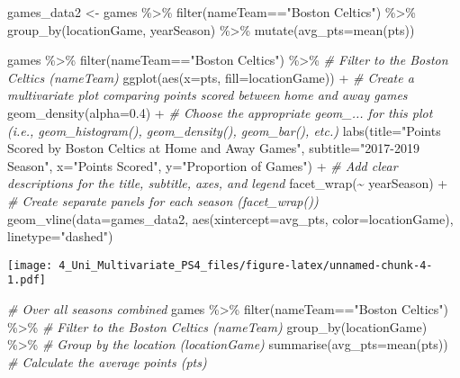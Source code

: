 \documentclass[
]{article}
\newenvironment{Shaded}{\begin{snugshade}}{\end{snugshade}}
\newcommand{\AttributeTok}[1]{\textcolor[rgb]{0.77,0.63,0.00}{#1}}
\newcommand{\CommentTok}[1]{\textcolor[rgb]{0.56,0.35,0.01}{\textit{#1}}}
\newcommand{\FloatTok}[1]{\textcolor[rgb]{0.00,0.00,0.81}{#1}}
\newcommand{\FunctionTok}[1]{\textcolor[rgb]{0.00,0.00,0.00}{#1}}
\newcommand{\NormalTok}[1]{#1}
\newcommand{\OtherTok}[1]{\textcolor[rgb]{0.56,0.35,0.01}{#1}}
\newcommand{\SpecialCharTok}[1]{\textcolor[rgb]{0.00,0.00,0.00}{#1}}
\newcommand{\StringTok}[1]{\textcolor[rgb]{0.31,0.60,0.02}{#1}}
\begin{document}
\begin{Shaded}
\begin{Highlighting}[]
\NormalTok{games\_data2 }\OtherTok{\textless{}{-}}\NormalTok{ games }\SpecialCharTok{\%\textgreater{}\%}
  \FunctionTok{filter}\NormalTok{(nameTeam}\SpecialCharTok{==}\StringTok{"Boston Celtics"}\NormalTok{) }\SpecialCharTok{\%\textgreater{}\%}
  \FunctionTok{group\_by}\NormalTok{(locationGame, yearSeason) }\SpecialCharTok{\%\textgreater{}\%}
  \FunctionTok{mutate}\NormalTok{(}\AttributeTok{avg\_pts=}\FunctionTok{mean}\NormalTok{(pts))}
  
\NormalTok{games }\SpecialCharTok{\%\textgreater{}\%}
  \FunctionTok{filter}\NormalTok{(nameTeam}\SpecialCharTok{==}\StringTok{"Boston Celtics"}\NormalTok{) }\SpecialCharTok{\%\textgreater{}\%} \CommentTok{\# Filter to the Boston Celtics (nameTeam)}
  \FunctionTok{ggplot}\NormalTok{(}\FunctionTok{aes}\NormalTok{(}\AttributeTok{x=}\NormalTok{pts, }\AttributeTok{fill=}\NormalTok{locationGame)) }\SpecialCharTok{+} \CommentTok{\# Create a multivariate plot comparing points scored between home and away games}
  \FunctionTok{geom\_density}\NormalTok{(}\AttributeTok{alpha=}\FloatTok{0.4}\NormalTok{) }\SpecialCharTok{+} \CommentTok{\# Choose the appropriate geom\_... for this plot (i.e., geom\_histogram(), geom\_density(), geom\_bar(), etc.)}
  \FunctionTok{labs}\NormalTok{(}\AttributeTok{title=}\StringTok{"Points Scored by Boston Celtics at Home and Away Games"}\NormalTok{,}
       \AttributeTok{subtitle=}\StringTok{"2017{-}2019 Season"}\NormalTok{,}
       \AttributeTok{x=}\StringTok{"Points Scored"}\NormalTok{,}
       \AttributeTok{y=}\StringTok{"Proportion of Games"}\NormalTok{) }\SpecialCharTok{+} \CommentTok{\# Add clear descriptions for the title, subtitle, axes, and legend}
  \FunctionTok{facet\_wrap}\NormalTok{(}\SpecialCharTok{\textasciitilde{}}\NormalTok{ yearSeason) }\SpecialCharTok{+} \CommentTok{\# Create separate panels for each season (facet\_wrap())}
  \FunctionTok{geom\_vline}\NormalTok{(}\AttributeTok{data=}\NormalTok{games\_data2, }\FunctionTok{aes}\NormalTok{(}\AttributeTok{xintercept=}\NormalTok{avg\_pts, }\AttributeTok{color=}\NormalTok{locationGame), }\AttributeTok{linetype=}\StringTok{"dashed"}\NormalTok{) }
\end{Highlighting}
\end{Shaded}

\texttt{[image: 4\_Uni\_Multivariate\_PS4\_files/figure-latex/unnamed-chunk-4-1.pdf]}

\begin{Shaded}
\begin{Highlighting}[]
\CommentTok{\# Over all seasons combined}
\NormalTok{games }\SpecialCharTok{\%\textgreater{}\%}
  \FunctionTok{filter}\NormalTok{(nameTeam}\SpecialCharTok{==}\StringTok{"Boston Celtics"}\NormalTok{) }\SpecialCharTok{\%\textgreater{}\%} \CommentTok{\# Filter to the Boston Celtics (nameTeam)}
  \FunctionTok{group\_by}\NormalTok{(locationGame) }\SpecialCharTok{\%\textgreater{}\%} \CommentTok{\# Group by the location (locationGame)}
  \FunctionTok{summarise}\NormalTok{(}\AttributeTok{avg\_pts=}\FunctionTok{mean}\NormalTok{(pts)) }\CommentTok{\# Calculate the average points (pts)}
\end{Highlighting}
\end{Shaded}
\end{document}
